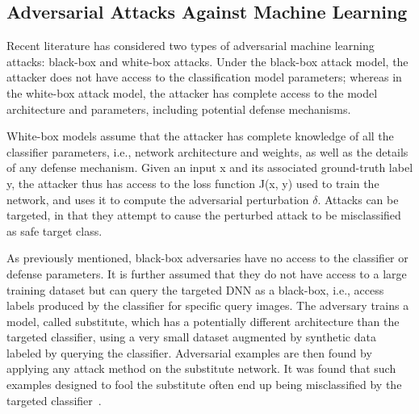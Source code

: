 \subsection{Adversarial Attacks Against Machine Learning}

Recent literature has considered two types of adversarial machine learning attacks: black-box and white-box attacks. Under the black-box attack model, the attacker does not have access to the classification model parameters; whereas in the white-box attack model, the attacker has complete access to the model architecture and parameters, including potential defense mechanisms.



White-box models assume that the attacker has complete knowledge of all the classifier parameters, i.e., network architecture and weights, as well as the details of any defense mechanism. Given an input x and its associated ground-truth label y, the attacker thus has access to the loss function J(x, y) used to train the network, and uses it to compute the adversarial perturbation $\delta$. Attacks can be targeted, in that they attempt to cause the perturbed attack to be misclassified as safe target class. 

As previously mentioned, black-box adversaries have no access to the classifier
or defense parameters. It is further assumed that they do not have access to a large training dataset
but can query the targeted DNN as a black-box, i.e., access labels produced by the classifier for
specific query images. The adversary trains a model, called substitute, which has a potentially
different architecture than the targeted classifier, using a very small dataset augmented by synthetic
data labeled by querying the classifier. Adversarial examples are then found by applying any
attack method on the substitute network. It was found that such examples designed to fool the substitute often end up being misclassified by the targeted classifier~\cite{szegedy2014going, papernot2017practical}. 




